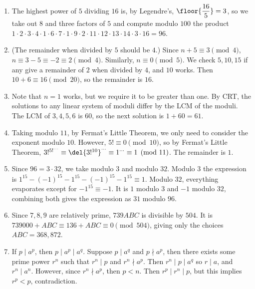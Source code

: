 \documentclass[10pt,paper=letter]{scrartcl}
\begin{document}
\begin{enumerate}

\item The highest power of $5$ dividing $16$ is, by Legendre's, $\floor{\dfrac{16}5} = 3$, so we take out $8$ and three factors of $5$ and compute modulo $100$ the product $1 \cdot 2 \cdot 3 \cdot 4 \cdot 1 \cdot 6 \cdot 7 \cdot 1 \cdot 9 \cdot 2 \cdot 11 \cdot 12 \cdot 13 \cdot 14 \cdot 3 \cdot 16 = 96$. 

\item (The remainder when divided by $5$ should be $4$.) Since $n + 5\equiv 3 \pmod 4$, $n \equiv 3 - 5 \equiv -2 \equiv 2 \pmod 4$. Similarly, $n \equiv 0 \pmod 5$. We check $5, 10, 15$ if any give a remainder of $2$ when divided by $4$, and $10$ works. Then $10 + 6 \equiv 16 \pmod 20$, so the remainder is $16$.

\item Note that $n = 1$ works, but we require it to be greater than one. By CRT, the solutions to any linear system of moduli differ by the LCM of the moduli. The LCM of $3, 4, 5, 6$ is $60$, so the next solution is $1 + 60 = 61$. 

\item Taking modulo $11$, by Fermat's Little Theorem, we only need to consider the exponent modulo $10$. However, $5! \equiv 0 \pmod 10$, so by Fermat's Little Theorem, $3!^{5!^{\cdots}} \equiv \del{3!^{10}}^{\cdots} \equiv 1^{\cdots} \equiv 1 \pmod {11}$. The remainder is $1$.

\item Since $96 = 3 \cdot 32$, we take modulo $3$ and modulo $32$. Modulo $3$ the expression is $1^{15} - (-1)^{15} - 1^{15} - (-1)^{15} - 1^{15} \equiv 1$. Modulo $32$, everything evaporates except for $-1^{15} \equiv -1$. It is $1$ modulo $3$ and $-1$ modulo $32$, combining both gives the expression as $31$ modulo $96$.

\item Since $7, 8, 9$ are relatively prime, $739ABC$ is divisible by $504$. It is $739000 + ABC \equiv 136 + ABC \equiv 0 \pmod {504}$, giving only the choices $ABC = 368, 872$.

\item If $p \mid a^p$, then $p \mid a^p \mid a^q$. Suppose $p \mid a^q$ and $p \nmid a^p$, then there exists some prime power $r^n$ such that $r^n \mid p$ and $r^n \nmid a^p$. Then $r^n \mid p \mid a^q$ so $r \mid a$, and $r^n \mid a^n$. However, since $r^n \nmid a^p$, then $p < n$. Then $r^p \mid r^n \mid p$, but this implies $r^p < p$, contradiction.

\end{enumerate}
\end{document}
